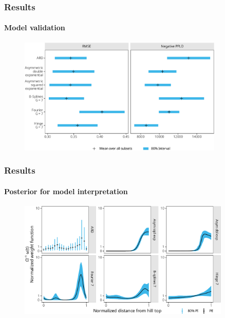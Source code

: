\documentclass{snedecorbeamer}
\begin{document}
\begin{frame}
  \frametitle{Results}
  \framesubtitle{Model validation}

  \begin{figure}
    \centering
    \includegraphics[height=15em]{inc/wepp_validation_summary_tiny_fsc140.pdf}
  \end{figure}

\end{frame}

\begin{frame}
  \frametitle{Results}
  \framesubtitle{Posterior for model interpretation}

  \begin{figure}
    \centering
    \includegraphics[height=15em]{inc/wepp_weight_posterior_tiny_fsc140.pdf}
  \end{figure}

\end{frame}
\end{document}
